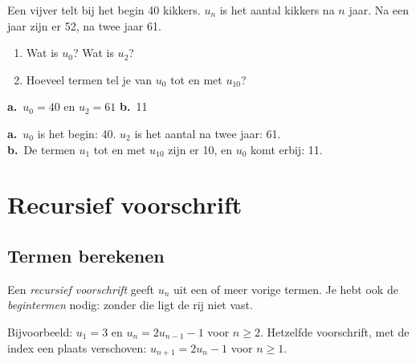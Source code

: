 \begin{oefeningen}
\begin{oefening}
Een vijver telt bij het begin 40 kikkers. $u_n$ is het aantal kikkers na $n$ jaar. Na een jaar zijn er 52, na twee jaar 61.
\begin{enumerate}
  \item Wat is $u_0$? Wat is $u_2$?
  \item Hoeveel termen tel je van $u_0$ tot en met $u_{10}$?
\end{enumerate}
\begin{solution}
\textbf{a.}~$u_0=40$ en $u_2=61$ \quad \textbf{b.}~11
\end{solution}
\begin{fullsolution}
\textbf{a.}~$u_0$ is het begin: 40. $u_2$ is het aantal na twee jaar: 61.\\
\textbf{b.}~De termen $u_1$ tot en met $u_{10}$ zijn er 10, en $u_0$ komt erbij: 11.
\end{fullsolution}
\end{oefening}
\end{oefeningen}

\section{Recursief voorschrift}

\subsection{Termen berekenen}

\begin{theorie}
Een \emph{recursief voorschrift} geeft $u_n$ uit een of meer vorige termen. Je hebt ook de \emph{begintermen} nodig: zonder die ligt de rij niet vast.
\end{theorie}

Bijvoorbeeld: $u_1 = 3$ en $u_n = 2u_{n-1} - 1$ voor $n \geqslant 2$. Hetzelfde voorschrift, met de index een plaats verschoven: $u_{n+1} = 2u_n - 1$ voor $n \geqslant 1$.



